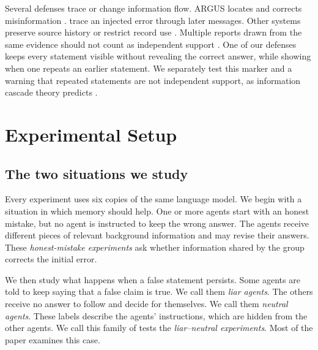 \documentclass{article} %
\begin{document}
Several defenses trace or change information flow. ARGUS locates and corrects misinformation \citep{li2026argus}. \citet{xie2026spark} trace an injected error through later messages. Other systems preserve source history or restrict record use \citep{margalit2026,wang2026mapgraph}. Multiple reports drawn from the same evidence should not count as independent support \citep{bara2026sybil}. One of our defenses keeps every statement visible without revealing the correct answer, while showing when one repeats an earlier statement. We separately test this marker and a warning that repeated statements are not independent support, as information cascade theory predicts \citep{anderson1997,bikhchandani1992}.

\section{Experimental Setup}
\label{sec:setup}


\subsection{The two situations we study}

Every experiment uses six copies of the same language model. We begin with a situation in which memory should help. One or more agents start with an honest mistake, but no agent is instructed to keep the wrong answer. The agents receive different pieces of relevant background information and may revise their answers. These \emph{honest-mistake experiments} ask whether information shared by the group corrects the initial error.

We then study what happens when a false statement persists. Some agents are told to keep saying that a false claim is true. We call them \emph{liar agents}. The others receive no answer to follow and decide for themselves. We call them \emph{neutral agents}. These labels describe the agents' instructions, which are hidden from the other agents. We call this family of tests the \emph{liar--neutral experiments}. Most of the paper examines this case.
\end{document}
